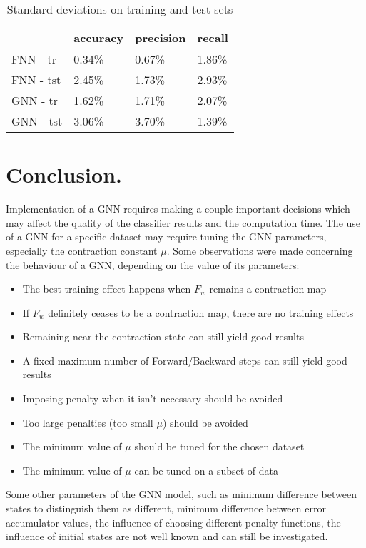 \documentclass[a4paper, 11pt, twocolumn]{spie}  %
\begin{document}
\begin{table}[h!]
	\begin{center}
	\begin{tabular}{llll}
	\toprule
	& accuracy & precision & recall \\
	\midrule
	FNN - tr &	0.34\% &  0.67\% & 1.86\% \\
	FNN - tst &	2.45\% &  1.73\% &  2.93\% \\
	GNN - tr &	1.62\% &  1.71\% &  2.07\% \\
	GNN - tst &	3.06\% &  3.70\% &  1.39\% \\
	\bottomrule
	\end{tabular}
	\caption{Standard deviations on training and test sets}
	\label{tab:crossstd}
	\end{center}
\end{table}

\section{Conclusion.}
Implementation of a GNN requires making a couple important decisions which may affect the quality of the classifier results and the computation time. The use of a GNN for a specific dataset may require tuning the GNN parameters, especially the contraction constant $\mu$. Some observations were made concerning the behaviour of a GNN, depending on the value of its parameters:
\begin{itemize}
	\item The best training effect happens when $F_w$ remains a contraction map
	\item If $F_w$ definitely ceases to be a contraction map, there are no training effects
	\item Remaining near the contraction state can still yield good results
	\item A fixed maximum number of Forward/Backward steps can still yield good results
	\item Imposing penalty when it isn't necessary should be avoided
	\item Too large penalties (too small $\mu$) should be avoided
	\item The minimum value of $\mu$ should be tuned for the chosen dataset
	\item The minimum value of $\mu$ can be tuned on a subset of data
\end{itemize}
Some other parameters of the GNN model, such as minimum difference between states to distinguish them as different, minimum difference between error accumulator values, the influence of choosing different penalty functions, the influence of initial states are not well known and can still be investigated.




\end{document}
